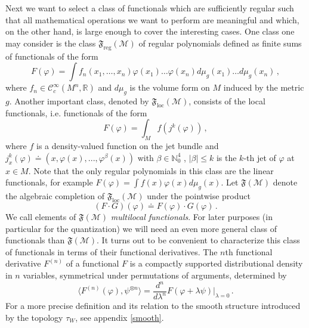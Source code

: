 \documentclass[12pt]{article}
\newcommand{\F}{\mathfrak{F}}
\newcommand{\Mcal}{\mathcal{M}}
\newcommand{\loc}{\mathrm{loc}}
\newcommand{\reg}{\mathrm{reg}}
\newcommand{\NN}{\mathbb{N}}          %
\newcommand{\ph}{\varphi}
\newcommand{\1}{\mathds{1}}                         %
\newcommand{\be}{\begin{equation}}
\newcommand{\ee}{\end{equation}}
\begin{document}
{Next we want to select a class of functionals which are sufficiently regular such that all mathematical operations we want to perform are meaningful and which, on the other hand, is large enough to cover the interesting cases. One class one may consider is the class $\F_\reg(\Mcal)$ of regular polynomials defined as finite sums of functionals of the form
\be
F(\ph)=\int f_n(x_1,\dots,x_n)\ph(x_1)\dots\ph(x_n)d\mu_g(x_1)\ldots d\mu_g(x_n)\,,
\ee
where $f_n\in\mathcal{C}^{\infty}_c(M^n,\mathbb{R})$ and $d\mu_g$ is the volume form on $M$ induced by the metric $g$. Another important class, denoted by $\F_\loc(\Mcal)$, consists of the local functionals, i.e. functionals of the form
\be
F(\ph)=\int_M f(j^k(\ph))\,,
\ee
where $f$ is a density-valued function on the jet bundle and $j_x^k(\ph)\doteq(x,\ph(x),...,\ph^{\beta}(x))$ with  $\beta\in\NN_0^4$ , $|\beta|\leq k$ is the $k$-th jet of $\ph$ at $x\in M$. Note that the only regular polynomials in this class are the linear functionals, for example $F(\ph)=\int f(x)\ph(x)d\mu_g(x)$. Let $\F(\Mcal)$ denote the algebraic completion of   $\F_\loc(\Mcal)$ under the pointwise product
\be\label{pointwise}
(F\cdot G)(\ph)\doteq F(\ph)\cdot G(\ph)\,.
\ee
We call elements of $\F(\Mcal)$ \textit{multilocal functionals}. For later purposes (in particular for the quantization) we will need an even more general class of functionals than $\F(\Mcal)$. It turns out to be convenient to characterize this class of functionals in terms of their functional derivatives. The $n$th functional derivative $F^{(n)}$ of a functional $F$ is  
a compactly supported distributional density in $n$ variables, symmetrical under permutations of arguments, determined by
\[\langle F^{(n)}(\ph),\psi^{\otimes n}\rangle=\frac{d^n}{d\lambda^n}F(\ph+\lambda\psi)|_{\lambda=0}\,.\]
For a more precise definition and its relation to the smooth structure introduced by the topology $\tau_W$, see appendix \ref{smooth}.

}
\end{document}
